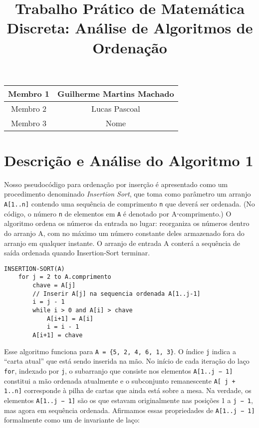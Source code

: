 \documentclass{article}
\title{Trabalho Prático de Matemática Discreta: Análise de Algoritmos de Ordenação}
\begin{document}
\maketitle

\begin{center}
\begin{tabular} {c c}
  \hline
  Membro 1 & Guilherme Martins Machado \\ [1ex]
  \hline
  Membro 2 & Lucas Pascoal \\ [1ex]
  \hline
  Membro 3 & Nome \\ [1ex]
  \hline
\end{tabular}
\end{center}

\section{Descrição e Análise do Algoritmo 1}

Nosso pseudocódigo para ordenação por inserção é apresentado como um procedimento denominado \textit{Insertion Sort}, que toma como parâmetro um arranjo \texttt{A[1..n]} contendo uma sequência de comprimento \texttt{n} que deverá ser ordenada. (No código, o número \texttt{n} de elementos em \texttt{A} é denotado por A⋅comprimento.) O algoritmo ordena os números da entrada no lugar: reorganiza os números dentro do arranjo A, com no máximo um número constante deles armazenado fora do arranjo em qualquer instante. O arranjo de entrada A conterá a sequência de saída ordenada quando Insertion-Sort terminar.

\begin{verbatim}
INSERTION-SORT(A)
    for j = 2 to A.comprimento
        chave = A[j]
        // Inserir A[j] na sequencia ordenada A[1..j-1]
        i = j - 1
        while i > 0 and A[i] > chave
            A[i+1] = A[i]
            i = i - 1
        A[i+1] = chave
\end{verbatim}

Esse algoritmo funciona para \texttt{A = \{5, 2, 4, 6, 1, 3\}}. O índice \texttt{j} indica a ``carta atual'' que está sendo inserida na mão. No início de cada iteração do laço \texttt{for}, indexado por \texttt{j}, o subarranjo que consiste nos elementos \texttt{A[1..j − 1]} constitui a mão ordenada atualmente e o subconjunto remanescente \texttt{A[ j + 1..n]} corresponde à pilha de cartas que ainda está sobre a mesa. Na verdade, os elementos \texttt{A[1..j − 1]} são os que estavam originalmente nas posições 1 a \texttt{j − 1}, mas agora em sequência ordenada. Afirmamos essas propriedades de \texttt{A[1..j − 1]} formalmente como um de invariante de laço:
\end{document}

